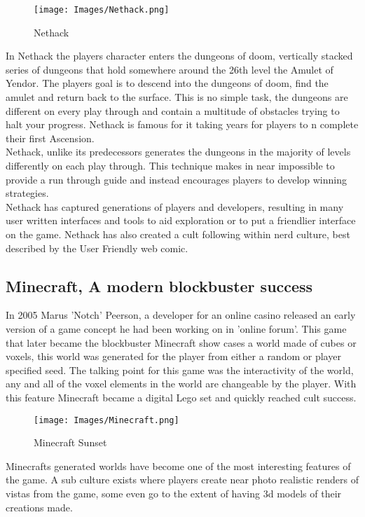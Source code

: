 \begin{figure}[h!]
  \texttt{[image: Images/Nethack.png]}
  \caption{Nethack}
\end{figure}

In Nethack the players character enters the dungeons of doom, vertically stacked
series of dungeons that hold somewhere around the 26th level the Amulet of 
Yendor. The players goal is to descend into the dungeons of doom, find the
amulet and return back to the surface. This is no simple task, the dungeons are 
different on every play through and contain a multitude of obstacles
trying to halt your progress. Nethack is famous for it taking years for players to 
n
complete their first Ascension.\\

Nethack, unlike its predecessors generates the dungeons in the majority of levels
differently on each play through. This technique makes in near impossible to 
provide a run through guide and instead encourages players to develop winning
strategies.\\

Nethack has captured generations of players and developers, resulting in many 
user written interfaces and tools to aid exploration or to put a friendlier 
interface on the game. Nethack has also created a cult following within nerd 
culture, best described by the User Friendly web comic.\\

\subsection*{Minecraft, A modern blockbuster success}
In 2005 Marus 'Notch' Peerson, a developer for an online casino released an
early version of a game concept he had been working on in 'online forum'. This
game that later became the blockbuster Minecraft \cite{Minecraft} show cases a 
world made of cubes 
or voxels, this world was generated for the player from either a random or 
player specified seed. The talking point for this game was the interactivity of
the world, any and all of the voxel elements in the world are changeable by the
player. With this feature Minecraft became a digital Lego set and quickly 
reached cult success.\\

\begin{figure}[h!]
  \texttt{[image: Images/Minecraft.png]}
  \caption{Minecraft Sunset}
\end{figure}

Minecrafts generated worlds have become one of the most interesting features of 
the game. A sub culture exists where players create near photo realistic renders
of vistas from the game, some even go to the extent of having 3d models of their
creations made. \\
